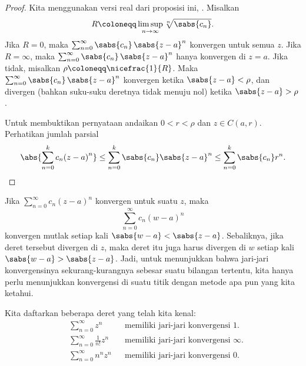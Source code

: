 \begin{proof}
Kita menggunakan versi real dari proposisi ini,
.
Misalkan
\begin{equation*}
R \coloneqq \limsup_{n\to\infty} \sqrt[n]{\sabs{c_n}} .
\end{equation*}
Jika $R = 0$, maka
$\sum_{n=0}^\infty \sabs{c_n} \, \sabs{z-a}^n$ konvergen untuk semua $z$.
Jika $R = \infty$, maka
$\sum_{n=0}^\infty \sabs{c_n} \, \sabs{z-a}^n$ hanya konvergen di $z=a$.
Jika tidak, misalkan $\rho \coloneqq \nicefrac{1}{R}$.
Maka
$\sum_{n=0}^\infty \sabs{c_n} \, \sabs{z-a}^n$ konvergen ketika
$\sabs{z-a} < \rho$, dan divergen (bahkan suku-suku deretnya
tidak menuju nol) ketika $\sabs{z-a} > \rho$.

Untuk membuktikan pernyataan  andaikan
$0 < r < \rho$ dan $z \in C(a,r)$.  Perhatikan
jumlah parsial
\begin{equation*}
\abs{\sum_{n=0}^k c_n {(z-a)}^n}
\leq
\sum_{n=0}^k \sabs{c_n} \sabs{z-a}^n
\leq
\sum_{n=0}^k \sabs{c_n} r^n . \qedhere
\end{equation*}
\end{proof}

Jika $\sum_{n=0}^\infty c_n {(z-a)}^n$ konvergen untuk suatu $z$, maka
\begin{equation*}
\sum_{n=0}^\infty c_n {(w-a)}^n
\end{equation*}
konvergen mutlak setiap kali $\sabs{w-a} < \sabs{z-a}$.
Sebaliknya, jika deret tersebut divergen di $z$, maka deret itu juga harus divergen di $w$
setiap kali $\sabs{w-a} > \sabs{z-a}$.
Jadi, untuk menunjukkan
bahwa jari-jari konvergensinya sekurang-kurangnya sebesar suatu bilangan tertentu, kita hanya perlu
menunjukkan konvergensi di suatu titik dengan metode apa pun yang kita ketahui.

\begin{example}
Kita daftarkan beberapa deret yang telah kita kenal:
\begin{align*}
& &
& \sum_{n=0}^\infty z^n
& & \text{memiliki jari-jari konvergensi } 1.
& &
\\
& &
& \sum_{n=0}^\infty \frac{1}{n!} z^n
& & \text{memiliki jari-jari konvergensi } \infty.
& &
\\
& &
& \sum_{n=0}^\infty n^n z^n
& & \text{memiliki jari-jari konvergensi } 0.
& &
\end{align*}
\end{example}

